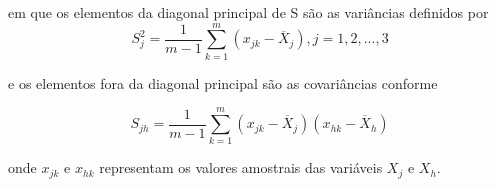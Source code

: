 em que os elementos da diagonal principal de S são as variâncias definidos por
\begin{equation}
S^2_j = \frac{1}{m-1} \sum_{k=1}^m (x_{jk} - \overline{X}_j),    j = 1, 2, ..., 3 
\label{eq:eq7}
\end{equation}

e os elementos fora da diagonal principal são as covariâncias conforme

\begin{equation}
S_{jh} = \frac{1}{m-1} \sum_{k=1}^m (x_{jk} - \overline{X}_j)(x_{hk} - \overline{X}_h) 
\label{eq:eq8}
\end{equation}

onde $x_{jk}$ e $x_{hk}$ representam os valores amostrais das variáveis $X_j$ e $X_h$.